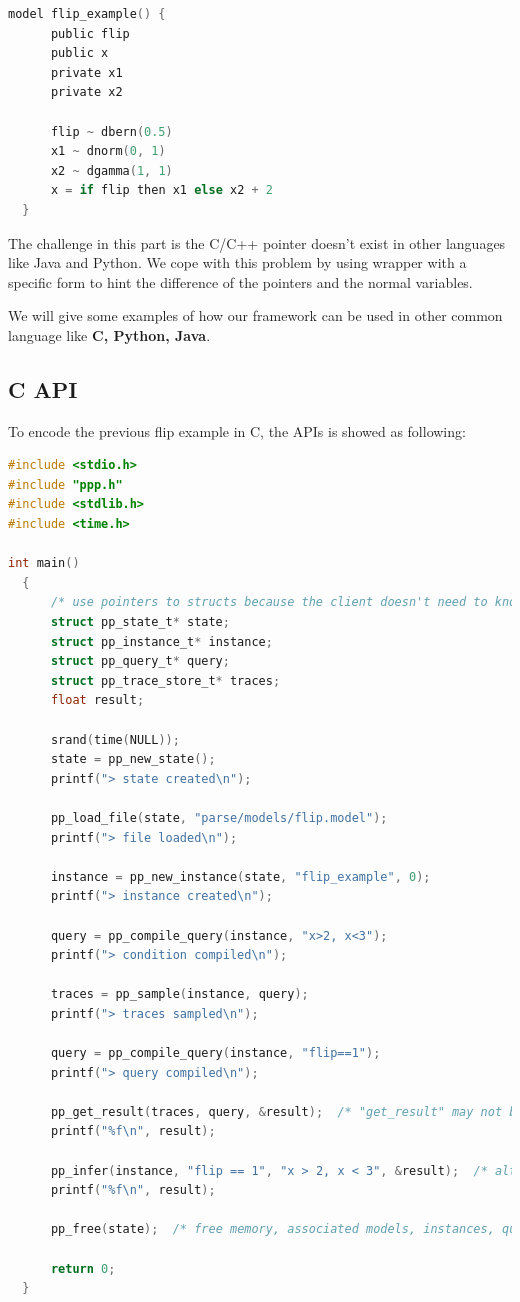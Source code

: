 \begin{lstlisting}[language=C]
  model flip_example() {
      public flip
      public x
      private x1
      private x2

      flip ~ dbern(0.5)
      x1 ~ dnorm(0, 1)
      x2 ~ dgamma(1, 1)
      x = if flip then x1 else x2 + 2
  }
\end{lstlisting}

The challenge in this part is the C/C++ pointer doesn’t exist in other languages like Java and Python. We cope with this problem by using wrapper with a specific form to hint the difference of the pointers and the normal variables.
  
We will give some examples of how our framework can be used in other common language like \textbf{C, Python, Java}.
  
\subsection{C API}
To encode the previous flip example in C, the APIs is showed as following:
\begin{lstlisting}[language=C]
#include <stdio.h>
#include "ppp.h"
#include <stdlib.h>
#include <time.h>

int main()
  {
      /* use pointers to structs because the client doesn't need to know the struct sizes */
      struct pp_state_t* state;
      struct pp_instance_t* instance;
      struct pp_query_t* query;
      struct pp_trace_store_t* traces;
      float result;

      srand(time(NULL));
      state = pp_new_state();
      printf("> state created\n");

      pp_load_file(state, "parse/models/flip.model");
      printf("> file loaded\n");

      instance = pp_new_instance(state, "flip_example", 0);
      printf("> instance created\n");

      query = pp_compile_query(instance, "x>2, x<3");
      printf("> condition compiled\n");

      traces = pp_sample(instance, query);
      printf("> traces sampled\n");

      query = pp_compile_query(instance, "flip==1");
      printf("> query compiled\n");

      pp_get_result(traces, query, &result);  /* "get_result" may not be a good name */
      printf("%f\n", result);

      pp_infer(instance, "flip == 1", "x > 2, x < 3", &result);  /* alternative way to get a result */
      printf("%f\n", result);

      pp_free(state);  /* free memory, associated models, instances, queries, and trace stores are deallocated */

      return 0;
  }
\end{lstlisting}
  
